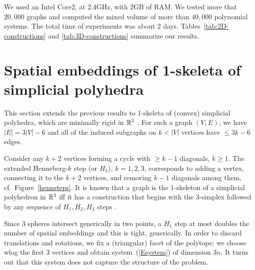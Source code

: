 \documentclass[envcountsame]{llncs}
\begin{document}
We used an Intel Core2, at 2.4GHz, with 2GB of RAM.
We tested more that $20, 000$ graphs and computed the mixed 
volume of more than $40, 000$ polynomial systems.
The total time of experiments was about 2 days.
Tables~\ref{tab:2D-constructions} and \ref{tab:3D-constructions} summarize our results. 

\section{Spatial embeddings of 1-skeleta of simplicial polyhedra} \label{Sgenerate3d}

This section extends the previous results to 1-skeleta of (convex) simplicial polyhedra,
which are minimally rigid in ${\mathbb R}^3$ \cite{G75}.
For such a graph $(V,E)$, we have $|E|=3|V|-6$ and
all of the induced subgraphs on $k<|V|$ vertices have $\le 3k-6$ edges.

Consider any $k+2$ vertices forming a cycle with $\ge k-1$ diagonals, $k\ge 1$.
The extended Henneberg-$k$ step (or $H_k$), $k=1,2,3$, corresponds to
adding a vertex, connecting it to the $k+2$ vertices, and
removing $k-1$ diagonals among them, cf.\ Figure~\ref{hennsteps}.
It is known that a graph is the 1-skeleton of a simplicial polyhedron in ${\mathbb R}^3$ iff
it has a construction that begins with the 3-simplex followed by any sequence
of $H_1, H_2, H_3$ steps \cite{BF67}.

Since 3 spheres intersect generically in two points, a $H_1$ step 
at most doubles the number of spatial embeddings and this is tight, generically.
In order to  discard translations and rotations, we fix a (triangular)
facet of the polytope; we choose wlog the first 3 vertices and obtain
system~(\ref{Esystem}) of dimension $3n$.
It turns out that this system does not capture the structure of the problem.
\end{document}

